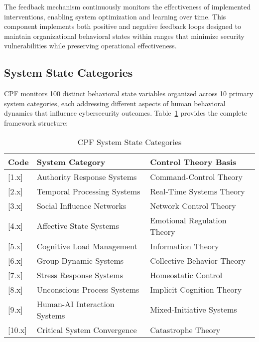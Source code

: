 \documentclass[journal]{IEEEtran}
\begin{document}
The feedback mechanism continuously monitors the effectiveness of implemented interventions, enabling system optimization and learning over time. This component implements both positive and negative feedback loops designed to maintain organizational behavioral states within ranges that minimize security vulnerabilities while preserving operational effectiveness.

\subsection{System State Categories}

CPF monitors 100 distinct behavioral state variables organized across 10 primary system categories, each addressing different aspects of human behavioral dynamics that influence cybersecurity outcomes. Table~\ref{tab:categories} provides the complete framework structure:

\begin{table}[!t]
\centering
\caption{CPF System State Categories}
\label{tab:categories}
\begin{tabular}{lll}
\toprule
Code & System Category & Control Theory Basis \\
\midrule
{[}1.x{]} & Authority Response Systems & Command-Control Theory \\
{[}2.x{]} & Temporal Processing Systems & Real-Time Systems Theory \\
{[}3.x{]} & Social Influence Networks & Network Control Theory \\
{[}4.x{]} & Affective State Systems & Emotional Regulation Theory \\
{[}5.x{]} & Cognitive Load Management & Information Theory \\
{[}6.x{]} & Group Dynamic Systems & Collective Behavior Theory \\
{[}7.x{]} & Stress Response Systems & Homeostatic Control \\
{[}8.x{]} & Unconscious Process Systems & Implicit Cognition Theory \\
{[}9.x{]} & Human-AI Interaction Systems & Mixed-Initiative Systems \\
{[}10.x{]} & Critical System Convergence & Catastrophe Theory \\
\bottomrule
\end{tabular}
\end{table}
\end{document}
